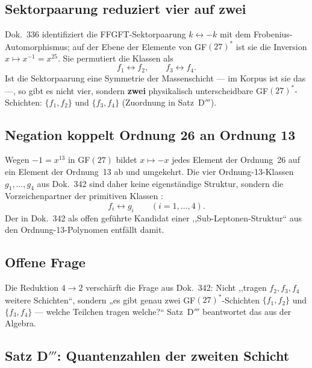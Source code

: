 \subsection{Sektorpaarung reduziert vier auf zwei}

Dok.~336 identifiziert die FFGFT-Sektorpaarung $k \leftrightarrow -k$ mit dem
Frobenius-Automorphismus; auf der Ebene der Elemente von GF$(27)^*$ ist sie die
Inversion $x \mapsto x^{-1} = x^{25}$. Sie permutiert die Klassen als \BM
\begin{equation}
  f_1 \longleftrightarrow f_2, \qquad f_3 \longleftrightarrow f_4 .
\end{equation}
Ist die Sektorpaarung eine Symmetrie der Massenschicht --- im Korpus ist sie das ---,
so gibt es nicht vier, sondern \textbf{zwei} physikalisch unterscheidbare
GF$(27)^*$-Schichten: $\{f_1, f_2\}$ und $\{f_3, f_4\}$ (Zuordnung in Satz~D$'''$).

\subsection{Negation koppelt Ordnung 26 an Ordnung 13}

Wegen $-1 = x^{13}$ in GF$(27)$ bildet $x \mapsto -x$ jedes Element der Ordnung~26
auf ein Element der Ordnung~13 ab und umgekehrt. Die vier Ordnung-13-Klassen
$g_1, \ldots, g_4$ aus Dok.~342 sind daher keine eigenständige Struktur, sondern
die Vorzeichenpartner der primitiven Klassen \BM:
\begin{equation}
  f_i \leftrightarrow g_i \qquad (i = 1, \ldots, 4).
\end{equation}
Der in Dok.~342 als offen geführte Kandidat einer ,,Sub-Leptonen-Struktur``
aus den Ordnung-13-Polynomen entfällt damit.

\subsection{Offene Frage}

Die Reduktion $4 \to 2$ verschärft die Frage aus Dok.~342: Nicht ,,tragen
$f_2, f_3, f_4$ weitere Schichten``, sondern „es gibt genau zwei
GF$(27)^*$-Schichten $\{f_1, f_2\}$ und $\{f_3, f_4\}$ --- welche Teilchen
tragen welche?“ Satz~D$'''$ beantwortet das aus der Algebra.

\subsection{Satz D$'''$: Quantenzahlen der zweiten Schicht}


